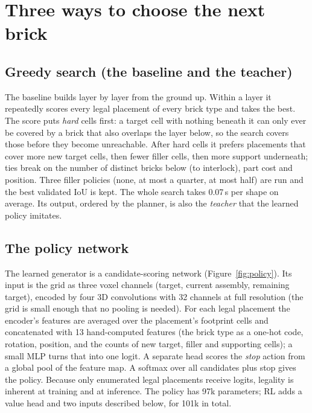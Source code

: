 \section{Three ways to choose the next brick}
\label{sec:generators}

\subsection{Greedy search (the baseline and the teacher)}
The baseline builds layer by layer from the ground up. Within a layer it repeatedly scores every legal placement of
every brick type and takes the best. The score puts \emph{hard} cells first: a target cell with nothing beneath it can
only ever be covered by a brick that also overlaps the layer below, so the search covers those before they become
unreachable. After hard cells it prefers placements that cover more new target cells, then fewer filler cells, then
more support underneath; ties break on the number of distinct bricks below (to interlock), part cost and position.
Three filler policies (none, at most a quarter, at most half) are run and the best validated IoU is kept. The whole
search takes 0.07\,s per shape on average. Its output, ordered by the planner, is also the \emph{teacher} that the
learned policy imitates.

\subsection{The policy network}
The learned generator is a candidate-scoring network (Figure~\ref{fig:policy}). Its input is the grid as three
voxel channels (target, current assembly, remaining target), encoded by four 3D convolutions with 32 channels at
full resolution (the grid is small enough that no pooling is needed). For each legal placement the encoder's features
are averaged over the placement's footprint cells and concatenated with 13 hand-computed features (the brick type as
a one-hot code, rotation, position, and the counts of new target, filler and supporting cells); a small MLP turns that
into one logit. A separate head scores the \emph{stop} action from a global pool of the feature map. A softmax over
all candidates plus stop gives the policy. Because only enumerated legal placements receive logits, legality is
inherent at training and at inference. The policy has 97k parameters; RL adds a value head and two inputs described
below, for 101k in total.

